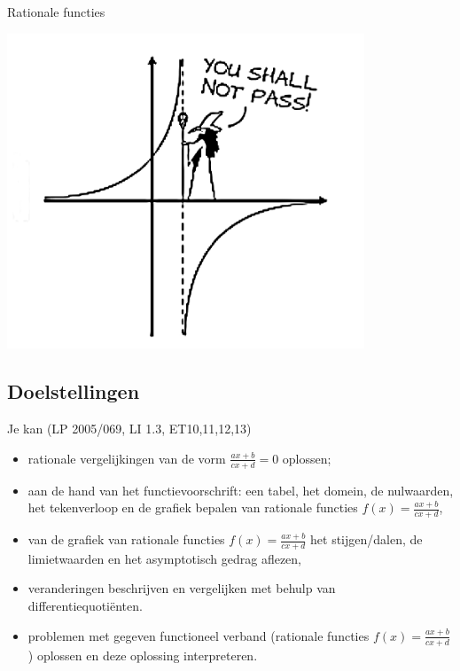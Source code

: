 \documentclass[12pt]{article}
\begin{document}
\pagestyle{fancy}
\lhead{}

\begin{theorie}

\thispagestyle{empty}
\begin{center}
  \begin{mdframed}
  \centering
  \fontsize{35}{70}\selectfont Rationale functies
  \end{mdframed}
  \vfill
  \includegraphics[width=0.8\textwidth]{youshallnotpass}
  \vfill
\end{center}
\vspace*{-2cm}
\begin{singlespace}
\subsection*{Doelstellingen}
Je kan \hfill  {\scriptsize(LP 2005/069, LI 1.3, ET10,11,12,13)}
\begin{itemize}
  \item rationale vergelijkingen van de vorm $\frac{ax+b}{cx+d}=0$ oplossen;
\item aan de hand van het functievoorschrift: een tabel, het domein, de nulwaarden, het tekenverloop en de grafiek bepalen van rationale functies $f(x)=\frac{ax+b}{cx+d}$,
  \item van de grafiek van rationale functies $f(x)=\frac{ax+b}{cx+d}$ het stijgen/dalen, de limietwaarden en het asymptotisch gedrag aflezen,
  \item veranderingen beschrijven en vergelijken met behulp van differentiequotiënten.
  \item problemen met gegeven functioneel verband (rationale functies $f(x)=\frac{ax+b}{cx+d}$) oplossen en deze oplossing interpreteren.
\end{itemize}
\end{singlespace}


\end{theorie}
\end{document}
